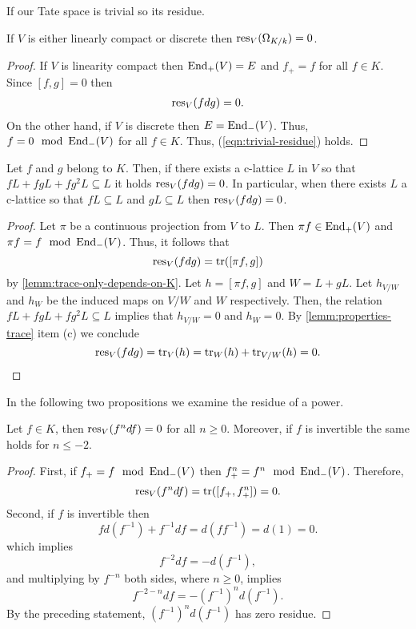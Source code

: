 If our Tate space is trivial so its residue.
\begin{proposition}\label{prop:residue-trivial-tate-space}
	If $V$ is either linearly compact or discrete then $\operatorname{res}_{V}(\Omega_{K/k}) = 0$.
\end{proposition}
\begin{proof}
	If $V$ is linearity compact then $\operatorname{End}_{+}(V) = E$ and $f_{+} = f$ for all $f \in K$. Since $[f,g] = 0$ then 
	\begin{align}\label{eqn:trivial-residue}
		\operatorname{res}_{V}(fdg) = 0.
	\end{align}
	On the other hand, if $V$ is discrete then $E = \operatorname{End}_{-}(V)$. Thus, $f = 0 \mod {\operatorname{End}}_{-}(V)$ for all $f \in K$. Thus, (\ref{eqn:trivial-residue}) holds.
\end{proof}
\begin{proposition}\label{prop:residue-and-continuity}
	Let $f$ and $g$ belong to $K$. Then, if there exists a c-lattice $L$ in $V$ so that $fL + fgL + fg^{2}L \subseteq L$ it holds $\operatorname{res}_{V}(fdg) = 0$. In particular, when there exists $L$ a c-lattice so that $fL \subseteq L$ and $gL \subseteq L$ then $\operatorname{res}_{V}(fdg) = 0$.
\end{proposition}
\begin{proof}
	Let $\pi$ be a continuous projection from $V$ to $L$. Then $\pi f \in \operatorname{End}_{+}(V)$ and $\pi f = f \mod {\operatorname{End}}_{-}(V)$. Thus, it follows that
	\[
		\operatorname{res}_{V}(fdg) = \operatorname{tr}([\pi f, g]) 
	\] 
	by \cref{lemm:trace-only-depends-on-K}. Let $h = [\pi f,g]$ and $W = L + gL$. Let $h_{V/W}$ and $h_{W}$ be the induced maps on $V/W$ and $W$ respectively. Then, the relation $fL + fgL + fg^{2}L \subseteq L$ implies that $h_{V/W} = 0$ and $h_{W} = 0$. By \cref{lemm:properties-trace} item (c) we conclude
	\[
		\operatorname{res}_{V}(fdg) = \operatorname{tr}_{V}(h) = \operatorname{tr}_{W}(h) + \operatorname{tr}_{V/W}(h) = 0.
	\]
\end{proof}
In the following two propositions we examine the residue of a power.
\begin{proposition}\label{prop:residue-of-a-power}
	Let $f \in K$, then $\operatorname{res}_{V}(f^{n}df) = 0$ for all $n \geq 0$. Moreover, if $f$ is invertible the same holds for $n \leq -2$.
\end{proposition}
\begin{proof}
	First, if $f_{+} = f \mod {\operatorname{End}}_{-}(V)$ then $f_{+}^{n} = f^{n} \mod {\operatorname{End}}_{-}(V)$. Therefore,
	\[
		\operatorname{res}_{V}(f^{n} df) = \operatorname{tr}([f_{+},f_{+}^{n}]) = 0.
	\]
	Second, if $f$ is invertible then
	\[
		fd(f^{-1}) + f^{-1}df = d(ff^{-1}) = d(1) = 0.
	\]
	which implies 
	\[
	f^{-2}df = -d(f^{-1}),
	\]
	and multiplying by $f^{-n}$ both sides, where $n\geq 0$, implies
	\[
	f^{-2-n}df = -(f^{-1})^{n}d(f^{-1}).
	\]
	By the preceding statement, $(f^{-1})^{n}d(f^{-1})$ has zero residue. 
\end{proof}
